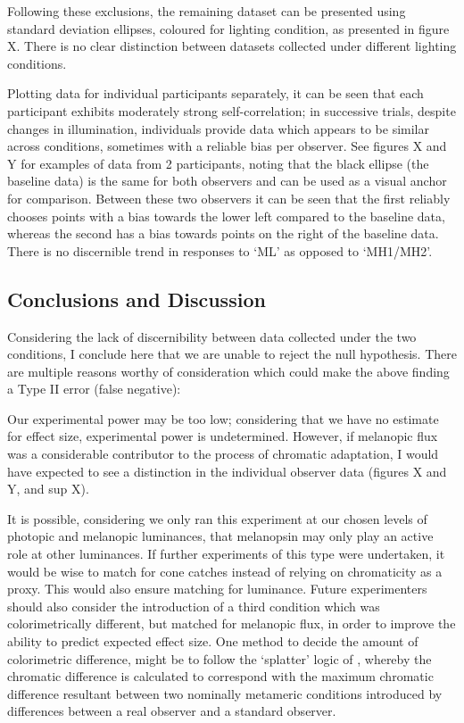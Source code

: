 Following these exclusions, the remaining dataset can be presented using standard deviation ellipses, coloured for lighting condition, as presented in figure X. There is no clear distinction between datasets collected under different lighting conditions.


Plotting data for individual participants separately, it can be seen that each participant exhibits moderately strong self-correlation; in successive trials, despite changes in illumination, individuals provide data which appears to be similar across conditions, sometimes with a reliable bias per observer. See figures X and Y for examples of data from 2 participants, noting that the black ellipse (the baseline data) is the same for both observers and can be used as a visual anchor for comparison. Between these two observers it can be seen that the first reliably chooses points with a bias towards the lower left compared to the baseline data, whereas the second has a bias towards points on the right of the baseline data. There is no discernible trend in responses to `ML' as opposed to `MH1/MH2'.


\subsection{Conclusions and Discussion}

Considering the lack of discernibility between data collected under the two conditions, I conclude here that we are unable to reject the null hypothesis.
There are multiple reasons worthy of consideration which could make the above finding a Type II error (false negative): 

Our experimental power may be too low; considering that we have no estimate for effect size, experimental power is undetermined. However, if melanopic flux was a considerable contributor to the process of chromatic adaptation, I would have expected to see a distinction in the individual observer data (figures X and Y, and sup X).

It is possible, considering we only ran this experiment at our chosen levels of photopic and melanopic luminances, that melanopsin may only play an active role at other luminances. If further experiments of this type were undertaken, it would be wise to match for cone catches instead of relying on chromaticity as a proxy. This would also ensure matching for luminance.
Future experimenters should also consider the introduction of a third condition which was colorimetrically different, but matched for melanopic flux, in order to improve the ability to predict expected effect size. One method to decide the amount of colorimetric difference, might be to follow the `splatter' logic of \citet{spitschan_human_2016}, whereby the chromatic difference is calculated to correspond with the maximum chromatic difference resultant between two nominally metameric conditions introduced by differences between a real observer and a standard observer.

